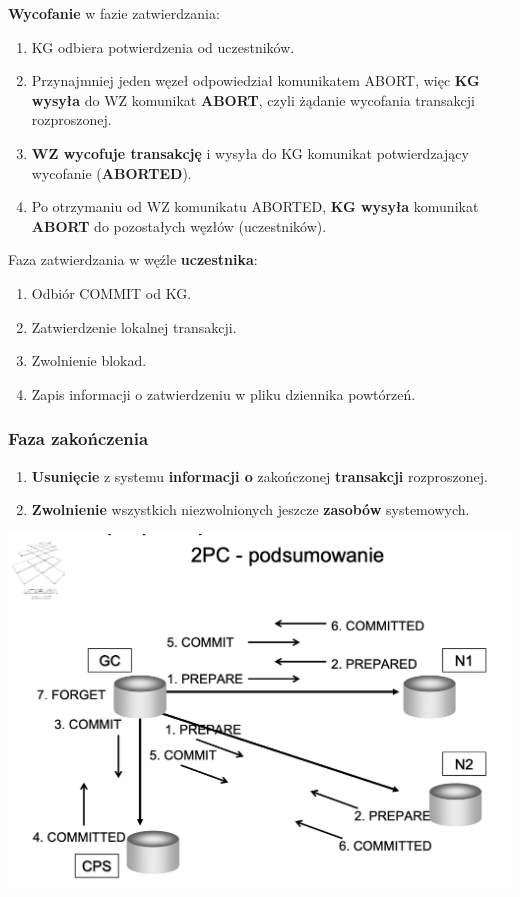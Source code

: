 \documentclass[a4paper]{article}
\begin{document}
    \textbf{Wycofanie} w fazie zatwierdzania:
    \begin{enumerate}
        \item KG odbiera potwierdzenia od uczestników.
        \item Przynajmniej jeden węzeł odpowiedział komunikatem ABORT, więc \textbf{KG wysyła} do
        WZ komunikat \textbf{ABORT}, czyli żądanie wycofania transakcji
        rozproszonej.
        \item \textbf{WZ wycofuje transakcję} i wysyła do KG komunikat
        potwierdzający wycofanie (\textbf{ABORTED}).
        \item Po otrzymaniu od WZ komunikatu ABORTED, \textbf{KG wysyła} komunikat \textbf{ABORT} do pozostałych węzłów (uczestników).
    \end{enumerate}

    Faza zatwierdzania w węźle \textbf{uczestnika}:
    \begin{enumerate}
        \item Odbiór COMMIT od KG.
        \item Zatwierdzenie lokalnej transakcji.
        \item Zwolnienie blokad.
        \item Zapis informacji o zatwierdzeniu w pliku dziennika powtórzeń.
    \end{enumerate}

    \subsubsection{Faza zakończenia}
    \begin{enumerate}
        \item \textbf{Usunięcie} z systemu \textbf{informacji o} zakończonej \textbf{transakcji} rozproszonej.
        \item \textbf{Zwolnienie} wszystkich niezwolnionych jeszcze \textbf{zasobów} systemowych.
    \end{enumerate}

    \begin{center}
        \includegraphics[width=\textwidth]{2pc}
    \end{center}
\end{document}

